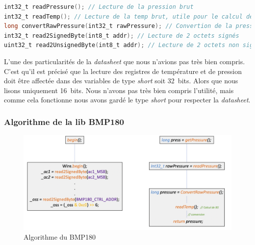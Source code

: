 \begin{lstlisting}[style=myC, caption=Fonctions privées de la librairie BMP180, language=C, frame=lines]
int32_t readPressure(); // Lecture de la pression brut
int32_t readTemp(); // Lecture de la temp brut, utile pour le calcul de B5 uniquement
long convertRawPressure(int32_t rawPressure); // Convertion de la pression brut
int32_t read2SignedByte(int8_t addr); // Lecture de 2 octets signés
uint32_t read2UnsignedByte(int8_t addr); // Lecture de 2 octets non signés
\end{lstlisting}

        \vspace{.5 cm}

        L'une des particularités de la \textit{datasheet} que nous n’avions pas très bien compris. C'est qu'il est précisé que la lecture des registres de température et de pression doit être affectée dans des variables de type \textit{short} soit 32~bits. Alors que 
        nous lisons uniquement 16~bits. Nous n'avons pas très bien compris l'utilité, mais comme cela fonctionne nous avons gardé le type \textit{short} pour respecter la \textit{datasheet}.

        \clearpage

        \noindent
        \subsubsection{Algorithme de la lib BMP180}
        \vspace{.2 cm}

        \begin{figure}[!h]
            \begin{center}
                \includegraphics[width=.65\textwidth]{img/code/algo_bmp.png}
                \caption{\label{fig:algo_bmp}Algorithme du BMP180}  
            \end{center}
        \end{figure}

      





